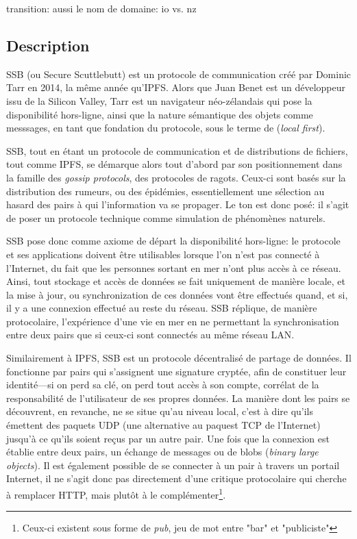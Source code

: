 \documentclass{article}
\begin{document}
transition: aussi le nom de domaine: io vs. nz

\subsection{Description}

SSB (ou Secure Scuttlebutt) est un protocole de communication créé par Dominic Tarr en 2014, la même année qu'IPFS. Alors que Juan Benet est un développeur issu de la Silicon Valley, Tarr est un navigateur néo-zélandais qui pose la disponibilité hors-ligne, ainsi que la nature sémantique des objets comme messsages, en tant que fondation du protocole, sous le terme de (\emph{local first}).

SSB, tout en étant un protocole de communication et de distributions de fichiers, tout comme IPFS, se démarque alors tout d'abord par son positionnement dans la famille des \emph{gossip protocols}, des protocoles de ragots. Ceux-ci sont basés sur la distribution des rumeurs, ou des épidémies, essentiellement une sélection au hasard des pairs à qui l'information va se propager. Le ton est donc posé: il s'agit de poser un protocole technique comme simulation de phénomènes naturels.

SSB pose donc comme axiome de départ la disponibilité hors-ligne: le protocole et ses applications doivent être utilisables lorsque l'on n'est pas connecté à l'Internet, du fait que les personnes sortant en mer n'ont plus accès à ce réseau. Ainsi, tout stockage et accès de données se fait uniquement de manière locale, et la mise à jour, ou synchronization de ces données vont être effectués quand, et si, il y a une connexion effectué au reste du réseau. SSB réplique, de manière protocolaire, l'expérience d'une vie en mer en ne permettant la synchronisation entre deux pairs que si ceux-ci sont connectés au même réseau LAN.

Similairement à IPFS, SSB est un protocole décentralisé de partage de données. Il fonctionne par pairs qui s'assignent une signature cryptée, afin de constituer leur identité—si on perd sa clé, on perd tout accès à son compte, corrélat de la responsabilité de l'utilisateur de ses propres données. La manière dont les pairs se découvrent, en revanche, ne se situe qu'au niveau local, c'est à dire qu'ils émettent des paquets UDP (une alternative au paquest TCP de l'Internet) jusqu'à ce qu'ils soient reçus par un autre pair. Une fois que la connexion est établie entre deux pairs, un échange de messages ou de blobs (\emph{binary large objects}). Il est également possible de se connecter à un pair à travers un portail Internet, il ne s'agit donc pas directement d'une critique protocolaire qui cherche à remplacer HTTP, mais plutôt à le complémenter\footnote{Ceux-ci existent sous forme de \emph{pub}, jeu de mot entre "bar" et "publiciste"}.
\end{document}
